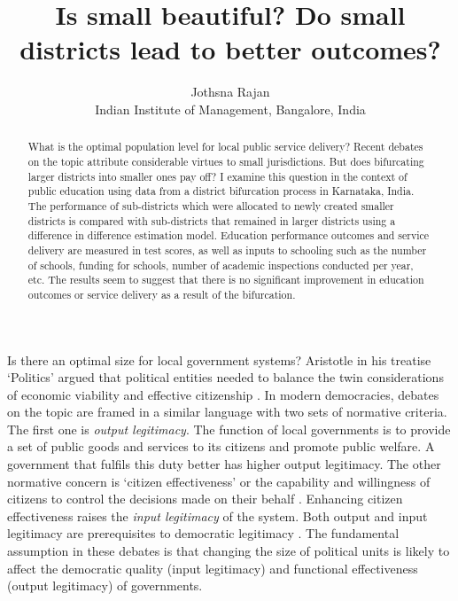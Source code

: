 \documentclass[12pt, a4paper]{article}
\title{Is small beautiful? Do small districts lead to better outcomes?}
\author{Jothsna Rajan \\
	\small{Indian Institute of Management, Bangalore, India}}
\begin{document}
	\maketitle
\begin{abstract}
	What is the optimal population level for local public service delivery? Recent debates on the topic attribute considerable virtues to small jurisdictions. But does bifurcating larger districts into smaller ones pay off? I examine this question in the context of public education using data from a district bifurcation process in Karnataka, India. The performance of sub-districts which were allocated to newly created smaller districts is compared with sub-districts that remained in larger districts using a difference in difference estimation model. Education performance outcomes and service delivery are measured in test scores, as well as inputs to schooling such as the number of schools, funding for schools, number of academic inspections conducted per year, etc. The results seem to suggest that there is no significant improvement in education outcomes or service delivery as a result of the bifurcation. 
\end{abstract}
\paragraph{} Is there an optimal size for local government systems? Aristotle in his treatise `Politics' argued that political entities needed to balance the twin considerations of economic viability and effective citizenship \parencite{aristotle_politics_1984}. In modern democracies, debates on the topic are framed in a similar language with two sets of normative criteria. The first one is \textit{output legitimacy}. The function of local governments is to provide a set of public goods and services to its citizens and promote public welfare. A government that fulfils this duty better has higher output legitimacy. The other normative concern is `citizen effectiveness' or the capability and willingness of citizens to control the decisions made on their behalf \parencite{dahl_size_1973}. Enhancing citizen effectiveness raises the \textit{input legitimacy} of the system. Both output and input legitimacy are prerequisites to democratic legitimacy \parencite{scharpf_governing_1999}. The fundamental assumption in these debates is that changing the size of political units is likely to affect the democratic quality (input legitimacy) and functional effectiveness (output legitimacy) of governments. 
	
\end{document}
